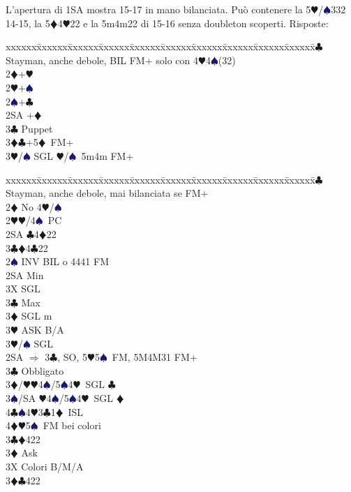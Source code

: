 \documentclass[a4paper,italian]{article}
\newcommand{\BC}{\textcolor{OliveGreen}{$\clubsuit$}}
\newcommand{\BD}{\textcolor{RedOrange}{$\vardiamondsuit$}}
\newcommand{\BH}{\textcolor{Red2}{$\varheartsuit${}}}
\newcommand{\BS}{\textcolor{MidnightBlue}{$\spadesuit${}}}
\newenvironment{bidtable}
{\begin{tabbing}

    xxxxxx\=xxxxxx\=xxxxxx\=xxxxxx\=xxxxxx\=xxxxxx\=xxxxxx\=xxxxxx\=xxxxxx\=xxxxxx\=\kill}
{\end{tabbing} }%
\begin{document}
\begin{multicols}{2}
    L'apertura di 1SA mostra 15-17 in mano bilanciata. Può contenere la 5\BH /\BS 332 14-15,
    la 5\BD 4\BH 22 e la 5m4m22 di 15-16 senza doubleton scoperti.
    Risposte:
    \bigbreak
    \begin{bidtable}
        2\BC \> Stayman, anche debole, BIL FM+ solo con 4\BH4\BS(32)\\
        2\BD {}+\BH \\
        2\BH {}+\BS \\
        2\BS {}+\BC \\
        2SA +\BD \\
        3\BC \> Puppet\\
        3\BD {}\BC +5\BD\ FM+\\
        3\BH/\BS \> SGL \BH/\BS\ 5m4m FM+
    \end{bidtable}
    \bigbreak
    \begin{bidtable}
        2\BC \> Stayman, anche debole, mai bilanciata se FM+\+\\
        2\BD \> No 4\BH /\BS \+\\
        2\BH {}\BH /4\BS\ PC\+\\
        2SA \BC 4\BD 22\\
        3\BC {}\BD 4\BC 22\-\\
        2\BS \> INV BIL o 4441 FM\+\\
        2SA \> Min\+\\
        3X \> SGL\-\\
        3\BC \> Max\+\\
        3\BD \> SGL m\+\\
        3\BH \> ASK B/A\-\\
        3\BH/\BS \> SGL\-\-\\
        2SA \> $\Rightarrow$ 3\BC , SO, 5\BH 5\BS\ FM, 5M4M31 FM+\+\\
        3\BC \> Obbligato\+\\
        3\BD/\BH {}\BH4\BS/5\BS4\BH\ SGL \BC \\
        3\BS/SA \BH4\BS/5\BS4\BH\ SGL \BD \\
        4\BC {}\BS 4\BH 3\BC 1\BD\ ISL\\
        4\BD {}\BH 5\BS\ FM bei colori\-\-\\
        3\BC {}\BD 422\+\\
        3\BD \> Ask\+\\
        3X \> Colori B/M/A\-\-\\
        3\BD {}\BC 422\+\\

\end{bidtable}
\end{multicols}
\end{document}
